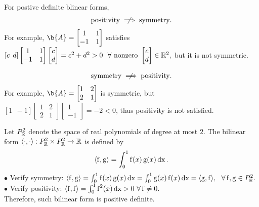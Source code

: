 \begin{remark}
For postive definite blinear forms,
%
\begin{align*}
    \textnormal{positivity} \centernot\implies \textnormal{symmetry}.
\end{align*}
%
For example, $\b{A} = 
%
\begin{bmatrix}
1 &1\\
-1 &1
\end{bmatrix}$
satisfies $ [c \>\> d]
\begin{bmatrix}
1 &1\\
-1 &1
\end{bmatrix}
\begin{bmatrix}
c\\
d 
\end{bmatrix}
= c^2 + d^2 > 0 ~\ \forall \textnormal{ nonzero } \begin{bmatrix}
c\\
d 
\end{bmatrix} \in \mathbb{R}^2,$
%
but it is not symmetric.

\begin{align*}
    \textnormal{symmetry} \centernot\implies \textnormal{positivity}.
\end{align*}
%
For example, $\b{A} = 
%
\begin{bmatrix}
1 &2\\
2 &1
\end{bmatrix}$
is symmetric, but
$ [1 \>\> -1]
\begin{bmatrix}
1 &2\\
2 &1
\end{bmatrix}
\begin{bmatrix}
1\\
-1 
\end{bmatrix}
= -2 < 0$,
thus positivity is not satisfied.
%
\end{remark}

\begin{example}
Let $P^2_{\mathbb{R}}$ denote the space of real polynomials of degree at most $2$. 
The bilinear form $\langle \cdot, \cdot \rangle: P^2_{\mathbb{R}} \times P^2_{\mathbb{R}} \to \mathbb{R}$ is defined by
%
$$\langle \operatorname{f}, \operatorname{g} \rangle = \int_{0}^1 \operatorname{f}(x) \operatorname{g}(x) \operatorname{d\textnormal{x}}.$$
%
$\bullet$ Verify symmetry: $\langle \operatorname{f}, \operatorname{g} \rangle = \int_{0}^1 \operatorname{f}(x) \operatorname{g}(x) \operatorname{d\textnormal{x}} = \int_{0}^1 \operatorname{g}(x) \operatorname{f}(x) \operatorname{d\textnormal{x}} = \langle \operatorname{g},\operatorname{f} \rangle, ~\ \forall \operatorname{f}, \operatorname{g} \in P^2_{\mathbb{R}}.$ \\
$\bullet$ Verify positivity: $\langle \operatorname{f}, \operatorname{f} \rangle = \int_{0}^1 \operatorname{f}^2(x) \operatorname{d\textnormal{x}} > 0 \ \forall \operatorname{f} \neq 0.$ \\
Therefore, such bilinear form is positive definite.
\end{example}

